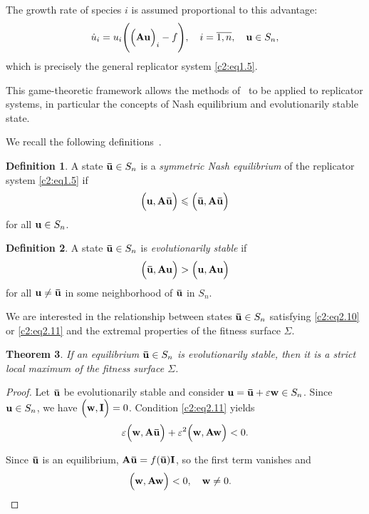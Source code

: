 \documentclass[12pt]{report}
\newtheorem{theorem}{Theorem}[section]
\theoremstyle{definition}
\newtheorem{definition}[theorem]{Definition}
\theoremstyle{remark}
\begin{document}
The growth rate of species $i$ is assumed proportional to this advantage:
$$
\dot{u}_{i} = u_{i}\Bigg(\Big({\bf Au}\Big)_{i} - f\Bigg), \quad i = \overline{1, n}, \quad {\bf u} \in S_{n},
$$
which is precisely the general replicator system \eqref{c2:eq1.5}.

This game-theoretic framework allows the methods of~\cite{c2:Maynard1982} to be applied to replicator systems, in particular the concepts of Nash equilibrium and evolutionarily stable state.

We recall the following definitions~\cite{c2:Hofbauer2003}.
\begin{definition}
	A state ${\bf \bar{u}} \in S_{n}$ is a \emph{symmetric Nash equilibrium} of the replicator system \eqref{c2:eq1.5} if
	\begin{equation}
		\label{c2:eq2.10}
		\Big({\bf u, A\bar{u}}\Big) \leqslant \Big({\bf \bar{u}, A\bar{u}}\Big)
	\end{equation}
	for all ${\bf u} \in S_{n}$.
\end{definition} 

\begin{definition}
	A state ${\bf \bar{u}} \in S_{n}$ is \emph{evolutionarily stable} if
	\begin{equation}
		\label{c2:eq2.11}
		\Big({\bf \bar{u}, Au}\Big) > \Big({\bf u, Au}\Big)
	\end{equation}
	for all ${\bf u} \neq {\bf \bar{u}}$ in some neighborhood of ${\bf \bar{u}}$ in $S_{n}$.
\end{definition}  

We are interested in the relationship between states ${\bf \bar{u}} \in S_{n}$ satisfying \eqref{c2:eq2.10} or \eqref{c2:eq2.11} and the extremal properties of the fitness surface $\Sigma$.

\begin{theorem}\label{c2:t2.3}
	If an equilibrium ${\bf \bar{u}} \in S_{n}$ is evolutionarily stable, then it is a strict local maximum of the fitness surface $\Sigma$.
\end{theorem}

\begin{proof}
	Let ${\bf \bar{u}}$ be evolutionarily stable and consider ${\bf u} = {\bf \bar{u}} + \varepsilon {\bf w} \in S_{n}$. Since ${\bf u} \in S_{n}$, we have $\Big({\bf w, I}\Big) = 0$. Condition \eqref{c2:eq2.11} yields
	$$
	\varepsilon\Big({\bf w, A\bar{u}}\Big) + \varepsilon^{2}\Big({\bf w, Aw}\Big) < 0. 
	$$
	
	Since ${\bf \bar{u}}$ is an equilibrium, ${\bf A\bar{u}} = f({\bf \bar{u}}){\bf I}$, so the first term vanishes and
	$$
	\Big({\bf w, Aw}\Big) < 0, \quad {\bf w} \neq 0. \quad 
	$$
\end{proof}
\end{document}
